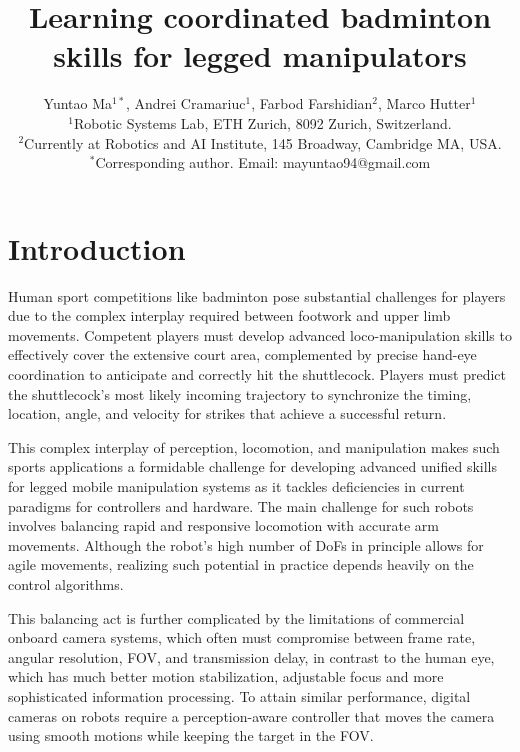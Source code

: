 \documentclass[9pt,twocolumn,twoside]{osajnl}
\title{Learning coordinated badminton skills for legged manipulators}
\author{
Yuntao Ma$^{1\ast}$,
Andrei Cramariuc$^{1}$,
Farbod Farshidian$^{2}$,
Marco Hutter$^{1}$
\\
\normalsize{$^{1}$Robotic Systems Lab, ETH Zurich, 8092 Zurich, Switzerland.} \\
\normalsize{$^{2}$Currently at Robotics and AI Institute, 145 Broadway, Cambridge MA, USA.} \\
\normalsize{$^\ast$Corresponding author. Email: mayuntao94@gmail.com} \\
}
\begin{document}
 
\maketitle 





\section*{Introduction}
Human sport competitions like badminton pose substantial challenges for players due to the complex interplay required between footwork and upper limb movements. Competent players must develop advanced loco-manipulation skills to effectively cover the extensive court area, complemented by precise hand-eye coordination to anticipate and correctly hit the shuttlecock. Players must predict the shuttlecock's most likely incoming trajectory to synchronize the timing, location, angle, and velocity for strikes that achieve a successful return.

This complex interplay of perception, locomotion, and manipulation makes such sports applications a formidable challenge for developing advanced unified skills for legged mobile manipulation systems as it tackles deficiencies in current paradigms for controllers and hardware. The main challenge for such robots involves balancing rapid and responsive locomotion with accurate arm movements. Although the robot's high number of \acp{DoF} in principle allows for agile movements, realizing such potential in practice depends heavily on the control algorithms.

This balancing act is further complicated by the limitations of commercial onboard camera systems, which often must compromise between frame rate, angular resolution, \ac{FOV}, and transmission delay, in contrast to the human eye, which has much better motion stabilization, adjustable focus and more sophisticated information processing. To attain similar performance, digital cameras on robots require a perception-aware controller that moves the camera using smooth motions while keeping the target in the \ac{FOV}. 
\end{document}

